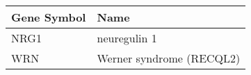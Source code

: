 \begin{tabular}{ll}
\toprule
Gene Symbol &                     Name \\
\midrule
       NRG1 &             neuregulin 1 \\
        WRN & Werner syndrome (RECQL2) \\
\bottomrule
\end{tabular}

